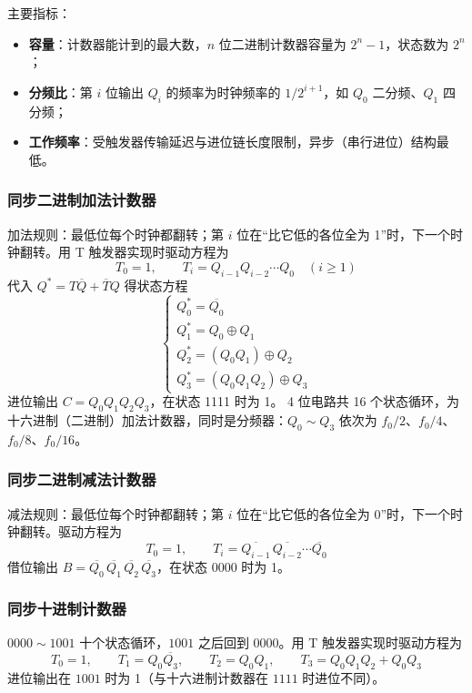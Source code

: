 \noindent 主要指标：
\begin{itemize}
    \item \textbf{容量}：计数器能计到的最大数，$n$ 位二进制计数器容量为 $2^n-1$，状态数为 $2^n$；
    \item \textbf{分频比}：第 $i$ 位输出 $Q_i$ 的频率为时钟频率的 $1/2^{i+1}$，如 $Q_0$ 二分频、$Q_1$ 四分频；
    \item \textbf{工作频率}：受触发器传输延迟与进位链长度限制，异步（串行进位）结构最低。
\end{itemize}

\subsubsection{同步二进制加法计数器}
加法规则：最低位每个时钟都翻转；第 $i$ 位在“比它低的各位全为 1”时，下一个时钟翻转。用 T 触发器实现时驱动方程为
\begin{equation}
T_0 = 1,\qquad T_i = Q_{i-1}Q_{i-2}\cdots Q_0 \quad (i\geq 1)
\label{eq:add_counter}
\end{equation}
代入 $Q^*=T\overline{Q}+\overline{T}Q$ 得状态方程
\begin{equation}
\begin{cases}
Q_0^* = \overline{Q_0}\\
Q_1^* = Q_0\oplus Q_1\\
Q_2^* = (Q_0Q_1)\oplus Q_2\\
Q_3^* = (Q_0Q_1Q_2)\oplus Q_3
\end{cases}
\label{eq:add_state}
\end{equation}
进位输出 $C=Q_0Q_1Q_2Q_3$，在状态 1111 时为 1。
4 位电路共 16 个状态循环，为十六进制（二进制）加法计数器，同时是分频器：$Q_0\sim Q_3$ 依次为 $f_0/2$、$f_0/4$、$f_0/8$、$f_0/16$。

\subsubsection{同步二进制减法计数器}
减法规则：最低位每个时钟都翻转；第 $i$ 位在“比它低的各位全为 0”时，下一个时钟翻转。驱动方程为
\begin{equation}
T_0 = 1,\qquad T_i = \overline{Q_{i-1}}\,\overline{Q_{i-2}}\cdots\overline{Q_0}
\label{eq:sub_counter}
\end{equation}
借位输出 $B=\overline{Q_0}\,\overline{Q_1}\,\overline{Q_2}\,\overline{Q_3}$，在状态 0000 时为 1。

\subsubsection{同步十进制计数器}
$0000\sim1001$ 十个状态循环，$1001$ 之后回到 $0000$。用 T 触发器实现时驱动方程为
\begin{equation}
T_0=1,\qquad T_1=Q_0\overline{Q_3},\qquad T_2=Q_0Q_1,\qquad T_3=Q_0Q_1Q_2+Q_0Q_3
\label{eq:dec_counter}
\end{equation}
进位输出在 $1001$ 时为 1（与十六进制计数器在 $1111$ 时进位不同）。

